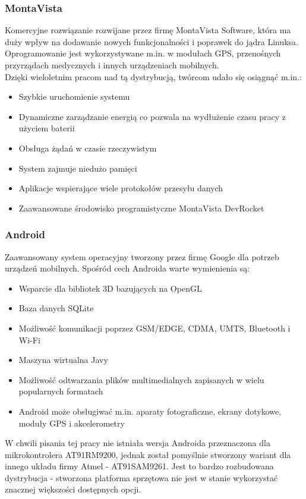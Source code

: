 \documentclass[a4paper,12pt]{book}
\begin{document}
				\subsubsection{MontaVista}
					Komercyjne rozwiązanie rozwijane przez firmę MontaVista Software, która ma duży wpływ na dodawanie nowych funkcjonalności i poprawek do jądra Linuksa. Oprogramowanie jest wykorzystywane m.in. w modułach GPS, przenośnych przyrządach medycznych i innych urządzeniach mobilnych.\\
					Dzięki wieloletnim pracom nad tą dystrybucją, twórcom udało się osiągnąć m.in.:
					\begin{itemize}
						\item Szybkie uruchomienie systemu
						\item Dynamiczne zarządzanie energią co pozwala na wydłużenie czasu pracy z użyciem baterii
						\item Obsługa żądań w czasie rzeczywistym
						\item System zajmuje niedużo pamięci
						\item Aplikacje wspierające wiele protokołów przesyłu danych
						\item Zaawansowane środowisko programistyczne MontaVista DevRocket
					\end{itemize}
				\subsubsection{Android}
					Zaawansowany system operacyjny tworzony przez firmę Google dla potrzeb urządzeń mobilnych. Spośród cech Androida warte wymienienia są:
					\begin{itemize}
						\item Wsparcie dla bibliotek 3D bazujących na OpenGL
						\item Baza danych SQLite
						\item Możliwość komunikacji poprzez GSM/EDGE, CDMA, UMTS, Bluetooth i Wi-Fi
						\item Maszyna wirtualna Javy
						\item Możliwość odtwarzania plików multimedialnych zapisanych w wielu popularnych formatach
						\item Android może obsługiwać m.in. aparaty fotograficzne, ekrany dotykowe, moduły GPS i akcelerometry
					\end{itemize}
					W chwili pisania tej pracy nie istniała wersja Androida przeznaczona dla mikrokontrolera AT91RM9200, jednak został pomyślnie stworzony wariant dla innego układu firmy Atmel - AT91SAM9261. Jest to bardzo rozbudowana dystrybucja - stworzona platforma sprzętowa nie jest w stanie wykorzystać znacznej większości dostępnych opcji.
\end{document}
